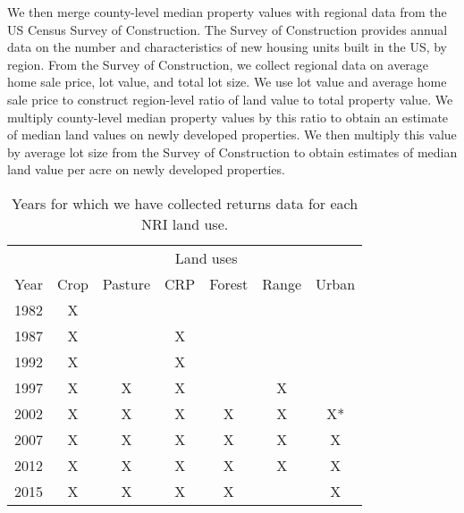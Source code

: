 \documentclass[11pt]{article}
\begin{document}
We then merge county-level median property values with regional data from the US Census Survey of Construction. The Survey of Construction provides annual data on the number and characteristics of new housing units built in the US, by region. From the Survey of Construction, we collect regional data on average home sale price, lot value, and total lot size. We use lot value and average home sale price to construct region-level ratio of land value to total property value. We multiply county-level median property values by this ratio to obtain an estimate of median land values on newly developed properties. We then multiply this value by average lot size from the Survey of Construction to obtain estimates of median land value per acre on newly developed properties.

\begin{table} \centering
\begin{threeparttable}[h!]
\caption{Years for which we have collected returns data for each NRI land use.} 
\begin{tabular}{lcccccc}
\toprule 
 & \multicolumn{6}{c}{Land uses} \\ \cline{2-7}
Year & Crop & Pasture & CRP & Forest & Range & Urban \\ \midrule
1982 & X & & & & & \\
1987 & X & & X & & &  \\
1992 & X & & X & & & \\
1997 & X & X & X & & X & \\ 
2002 & X & X &  X & X& X & X* \\ 
2007 & X & X & X & X & X & X \\
2012 & X & X & X & X & X & X\\
2015 & X & X & X & X &  & X \\ \bottomrule
\end{tabular}
\end{threeparttable}
\end{table}



\end{document}
